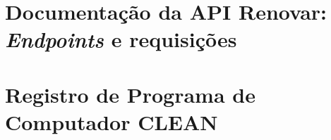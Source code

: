 \chapter{Documentação da API Renovar: \textit{Endpoints} e requisições}
\label{anex:renovar-api}



\chapter{Registro de Programa de Computador CLEAN}
\label{anex:patente}

